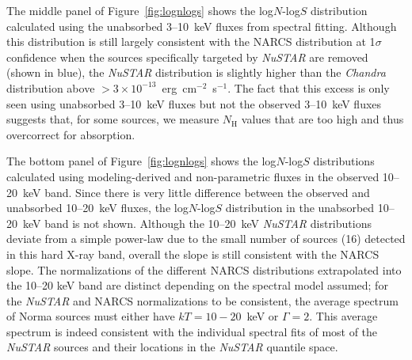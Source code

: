 \documentclass[iop,revtex4]{emulateapj}
\begin{document}
The middle panel of Figure~\ref{fig:lognlogs} shows the log$N$-log$S$ distribution calculated using the unabsorbed 3--10~keV fluxes from spectral fitting.  Although this distribution is still largely consistent with the NARCS distribution at 1$\sigma$ confidence when the sources specifically targeted by \textit{NuSTAR} are removed (shown in blue), the \textit{NuSTAR} distribution is slightly higher than the \textit{Chandra} distribution above $>3\times10^{-13}$~erg~cm$^{-2}$~s$^{-1}$.  The fact that this excess is only seen using unabsorbed 3--10~keV fluxes but not the observed 3--10~keV fluxes suggests that, for some sources, we measure $N_{\mathrm{H}}$ values that are too high and thus overcorrect for absorption. \par
The bottom panel of Figure~\ref{fig:lognlogs} shows the log$N$-log$S$ distributions calculated using modeling-derived and non-parametric fluxes in the observed 10--20~keV band.  Since there is very little difference between the observed and unabsorbed 10--20~keV fluxes, the log$N$-log$S$ distribution in the unabsorbed 10--20~keV band is not shown.  Although the 10--20~keV \textit{NuSTAR} distributions deviate from a simple power-law due to the small number of sources (16) detected in this hard X-ray band, overall the slope is still consistent with the NARCS slope.  The normalizations of the different NARCS distributions extrapolated into the 10--20 keV band are distinct depending on the spectral model assumed; for the \textit{NuSTAR} and NARCS normalizations to be consistent, the average spectrum of Norma sources must either have $kT=10-20$~keV or $\Gamma=2$.  This average spectrum is indeed consistent with the individual spectral fits of most of the \textit{NuSTAR} sources and their locations in the \textit{NuSTAR} quantile space.
\end{document}
